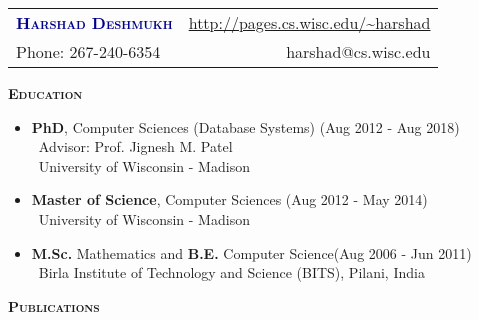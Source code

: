 \documentclass[11pt]{article}
\newcommand{\graybox}[1]{\begin{mdframed}[backgroundcolor=light-gray, linecolor=light-gray, roundcorner=10pt, shadow=false, shadowsize=1pt]
\Large{\textbf{\textsc{#1}}}
\end{mdframed}}
\begin{document}
\begin{flushleft}
\begin{tabular*}{\textwidth}{@{\extracolsep{\fill}}lr}%
{\LARGE{\textcolor{darkblue}{\textbf{\textsc{Harshad Deshmukh}}}}} & \url{http://pages.cs.wisc.edu/~harshad}\\
Phone: 267-240-6354 & harshad@cs.wisc.edu
\end{tabular*}
\end{flushleft}
\graybox{Education}
\begin{itemize}\addtolength{\itemsep}{-0.5\baselineskip}
\item{\textbf{PhD}, Computer Sciences (Database Systems) \hfill (Aug 2012 - Aug 2018) }\\
	\textendash\ Advisor: Prof. Jignesh M. Patel\\
	\textendash\ University of Wisconsin - Madison
\item{\textbf{Master of Science}, Computer Sciences \hfill (Aug 2012 - May 2014) }\\
	\textendash\ University of Wisconsin - Madison
\item{\textbf{M.Sc.} Mathematics and \textbf{B.E.} Computer Science\hfill (Aug 2006 - Jun 2011) }\\
	\textendash\ Birla Institute of Technology and Science (BITS), Pilani, India
\end{itemize}
\graybox{Publications}
\end{document}
